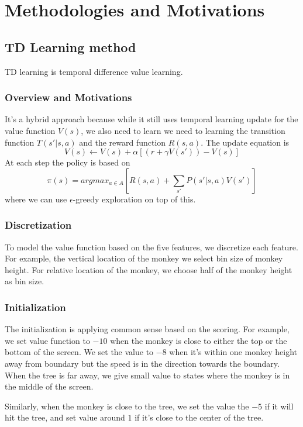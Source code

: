 \documentclass[submit]{harvardml}
\begin{document}
\section{Methodologies and Motivations}

\subsection{TD Learning method}

TD learning is temporal difference value learning. 

\subsubsection{Overview and Motivations}
It's a hybrid approach because while it still uses temporal learning update for the value function $V(s)$, we also need to learn we need to learning the transition function $T(s'|s,a)$ and the reward function $R(s,a)$.  
The update equation is
$$V(s) \leftarrow V(s) + \alpha [ (r+\gamma V(s')) - V(s) ]$$
At each step the policy is based on 
$$\pi(s) = argmax_{a\in A} [ R(s,a) + \sum_{s'} P(s'|s,a) V(s') ]$$
where we can use $\epsilon$-greedy exploration on top of this.

\subsubsection{Discretization}
To model the value function based on the five features, we discretize each feature. For example, the vertical location of the monkey we select bin size of monkey height. For relative location of the monkey, we choose half of the monkey height as bin size. 

\subsubsection{Initialization}
The initialization is applying common sense based on the scoring. For example, we set value function to $-10$ when the monkey is close to either the top or the bottom of the screen. We set the value to $-8$ when it's within one monkey height away from boundary but the speed is in the direction towards the boundary. When the tree is far away, we give small value to states where the monkey is in the middle of the screen.

Similarly, when the monkey is close to the tree, we set the value the $-5$ if it will hit the tree, and set value around $1$ if it's close to the center of the tree.
\end{document}

